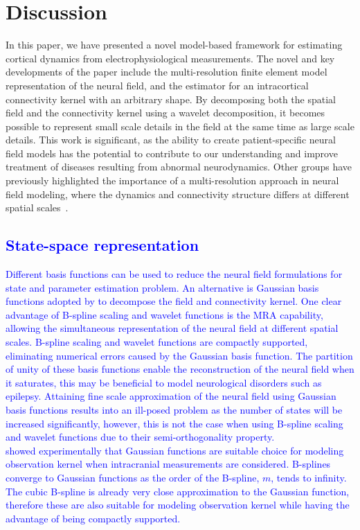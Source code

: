 \documentclass[review,authoryear,3p]{elsarticle}
\newcommand{\parham}[1]{\textcolor{blue}{#1}}
\begin{document}
\section{Discussion}
In this paper, we have presented a novel model-based framework for estimating cortical dynamics from electrophysiological measurements. The novel and key developments of the paper include the multi-resolution finite element model representation of the neural field, and the estimator for an intracortical connectivity kernel with an arbitrary shape. By decomposing both the spatial field and the connectivity kernel using a wavelet decomposition, it becomes possible to represent small scale details in the field at the same time as large scale details. This work is significant, as the ability to create patient-specific neural field models has the potential to contribute to our understanding and improve treatment of diseases resulting from abnormal neurodynamics. Other groups have previously highlighted the importance of a multi-resolution approach in neural field modeling, where the dynamics and connectivity structure differs at different spatial scales~\citep{Jirsa2002,Jirsa2004,Breakspear2005,Qubbaj2009,Schultze-Kraft2011}. 
\parham{\subsection{State-space representation}
Different basis functions can be used to reduce the neural field formulations for state and parameter estimation problem. An alternative is Gaussian basis functions  adopted by \cite{Freestone2011} to decompose the field and connectivity kernel. One clear advantage of B-spline scaling and wavelet functions is the MRA capability, allowing the simultaneous representation of the neural field at different spatial scales. B-spline scaling and wavelet functions are compactly supported, eliminating  numerical errors caused by the Gaussian basis function. The partition of unity of these basis functions enable the reconstruction of the neural field when it saturates, this may be beneficial to model neurological disorders such as epilepsy. Attaining fine scale approximation of the neural field using Gaussian basis functions results into an ill-posed problem as the number of states will be increased significantly, however, this is not the case when using B-spline scaling and wavelet functions due to their semi-orthogonality property.\\ \cite{Freestone2011} showed experimentally that Gaussian functions are suitable choice for modeling  observation kernel when intracranial measurements are considered. B-splines converge to Gaussian functions as the order of the B-spline, $m$, tends to infinity. The cubic B-spline is already very close approximation to the Gaussian function, therefore these are also suitable for modeling observation kernel while having the advantage of being compactly supported.}
\end{document}
